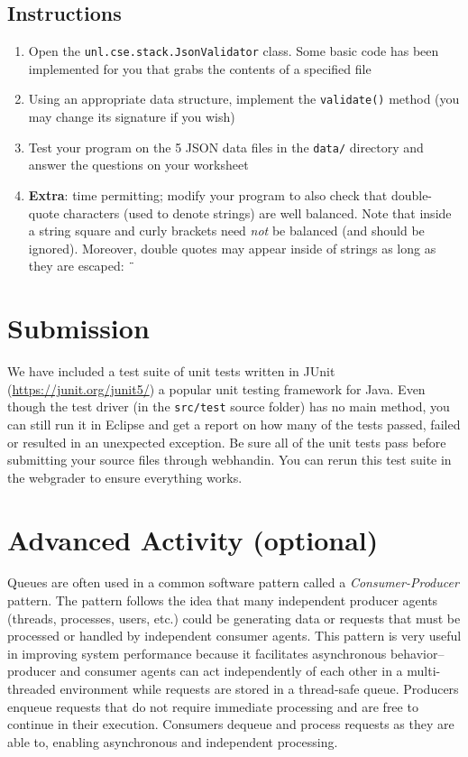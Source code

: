\documentclass[12pt]{scrartcl}
\begin{document}
\subsection*{Instructions}

\begin{enumerate}
  \item Open the \texttt{unl.cse.stack.JsonValidator} class.
    Some basic code has been implemented for you that grabs the 
    contents of a specified file
  \item Using an appropriate data structure, implement the 
    \texttt{validate()} method (you may change its signature 
    if you wish)
  \item Test your program on the 5 JSON data files in the 
    \texttt{data/} directory and answer the questions 
    on your worksheet
  \item \textbf{Extra}: time permitting; modify your program to also 
    check that double-quote characters (used to denote strings) are 
    well balanced.  Note that inside a string square and curly brackets 
    need \emph{not} be balanced (and should be ignored).  Moreover, 
    double quotes may appear inside of strings as long as they are 
    escaped: \texttt{\"}
\end{enumerate}

\section*{Submission}

We have included a test suite of unit tests written in JUnit 
(\url{https://junit.org/junit5/}) a popular unit testing framework for
Java.  Even though the test driver (in the \texttt{src/test}
source folder) has no main method, you can still run it in Eclipse and
get a report on how many of the tests passed, failed or resulted in 
an unexpected exception.  Be sure all of the unit tests pass before
submitting your source files through webhandin.  You can rerun this
test suite in the webgrader to ensure everything works.  


\section*{Advanced Activity (optional)}

Queues are often used in a common software pattern called a 
\emph{Consumer-Producer} pattern.  The pattern follows the idea that 
many independent producer agents (threads, processes, users, etc.) 
could be generating data or requests that must be processed or handled 
by independent consumer agents.  This pattern is very useful in 
improving system performance because it facilitates asynchronous 
behavior--producer and consumer agents can act independently of each 
other in a multi-threaded environment while requests are stored in a 
thread-safe queue.  Producers enqueue requests that do not require 
immediate processing and are free to continue in their execution.  
Consumers dequeue and process requests as they are able to, enabling 
asynchronous and independent processing.
\end{document}
